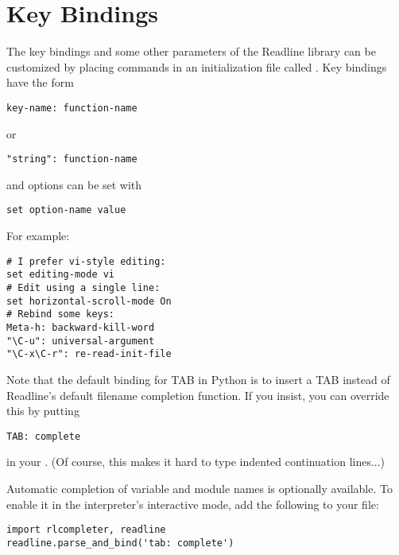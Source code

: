 \documentclass{manual}
\begin{document}
\section{Key Bindings \label{keyBindings}}

The key bindings and some other parameters of the Readline library can
be customized by placing commands in an initialization file called
.  Key bindings have the form

\begin{verbatim}
key-name: function-name
\end{verbatim}

or

\begin{verbatim}
"string": function-name
\end{verbatim}

and options can be set with

\begin{verbatim}
set option-name value
\end{verbatim}

For example:

\begin{verbatim}
# I prefer vi-style editing:
set editing-mode vi
# Edit using a single line:
set horizontal-scroll-mode On
# Rebind some keys:
Meta-h: backward-kill-word
"\C-u": universal-argument
"\C-x\C-r": re-read-init-file
\end{verbatim}

Note that the default binding for TAB in Python is to insert a TAB
instead of Readline's default filename completion function.  If you
insist, you can override this by putting

\begin{verbatim}
TAB: complete
\end{verbatim}

in your .  (Of course, this makes it hard to type
indented continuation lines...)

Automatic completion of variable and module names is optionally
available.  To enable it in the interpreter's interactive mode, add
the following to your  file:%

\begin{verbatim}
import rlcompleter, readline
readline.parse_and_bind('tab: complete')
\end{verbatim}
\end{document}
